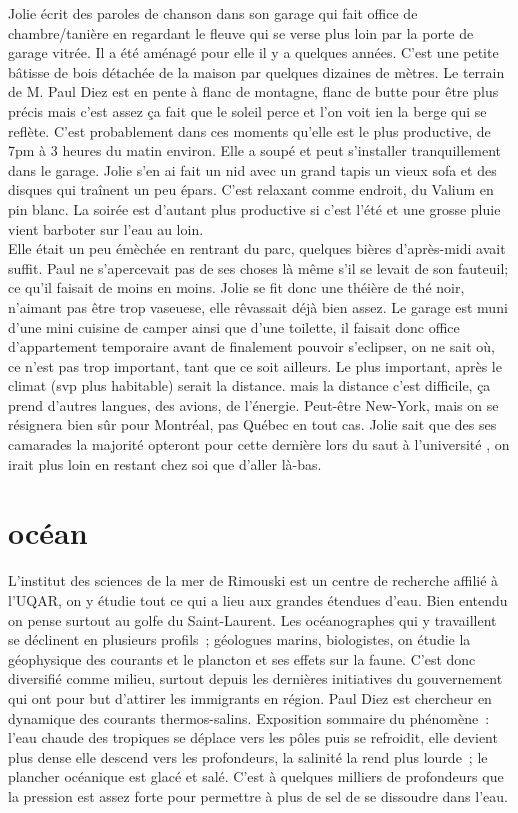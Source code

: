 \documentclass{article}
\begin{document}
Jolie écrit des paroles de chanson dans son garage qui fait office de
chambre/tanière en regardant le fleuve qui se verse plus loin par la porte de
garage vitrée. Il a été aménagé pour elle il y a quelques années. C’est une
petite bâtisse de bois détachée de la maison par quelques dizaines de mètres.
Le terrain de M. Paul Diez est en pente à flanc de montagne, flanc de butte
pour être plus précis mais c’est assez ça fait que le soleil perce et l’on voit
ien la berge qui se reflète.  C’est probablement dans ces moments qu’elle est
le plus productive, de 7pm à 3 heures du matin environ. Elle a  soupé et peut
s’installer tranquillement dans le garage. Jolie s’en ai fait un nid avec un
grand tapis un vieux sofa et des disques qui traînent un peu épars. C’est
relaxant comme endroit, du Valium en pin blanc. La soirée est d’autant plus
productive si c’est l’été et une grosse pluie vient barboter sur l'eau au
loin.\\

Elle était un peu émèchée en rentrant du parc, quelques bières d'après-midi
avait suffit. Paul ne s'apercevait pas de ses choses là même s'il se levait de
son fauteuil; ce qu'il faisait de moins en moins. Jolie se fit donc une théière
de thé noir, n'aimant pas être trop vaseuese, elle rêvassait déjà bien assez.
Le garage est muni d'une mini cuisine de camper ainsi que d'une toilette, il
faisait donc office d'appartement temporaire avant de finalement pouvoir
s'eclipser, on ne sait où, ce n'est pas trop important, tant que ce soit
ailleurs. Le plus important, après le climat (svp plus habitable) serait la
distance. mais la distance c'est difficile, ça prend d'autres langues, des
avions, de l'énergie. Peut-être New-York, mais on se résignera bien sûr pour
Montréal, pas Québec en tout cas. Jolie sait que des ses camarades la majorité
opteront pour cette dernière lors du saut à l'université , on irait plus loin
en restant chez soi que d'aller là-bas.



\clearpage

\section*{océan}

L’institut des sciences de la mer de Rimouski est un centre de recherche
affilié à l’UQAR, on y étudie tout ce qui a lieu aux grandes étendues d’eau.
Bien entendu on pense surtout au golfe du Saint-Laurent. Les océanographes qui
y travaillent se déclinent en plusieurs profils ; géologues marins,
biologistes, on étudie la géophysique des courants et le plancton et ses effets
sur la faune.  C’est donc diversifié comme milieu, surtout depuis les dernières
initiatives du gouvernement qui ont pour but d’attirer les immigrants en
région. Paul Diez est chercheur en dynamique des courants thermos-salins.
Exposition sommaire du phénomène : l’eau chaude des tropiques se déplace vers
les pôles puis se refroidit, elle devient plus dense elle descend vers les
profondeurs, la salinité la rend plus lourde ; le plancher océanique est glacé
et salé. C’est à quelques milliers de profondeurs que la pression est assez
forte pour permettre à plus de sel de se dissoudre dans l’eau.\\
\end{document}
